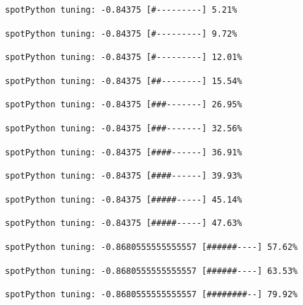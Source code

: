 \documentclass[
  letterpaper,
  DIV=11,
  numbers=noendperiod]{scrreprt}
\begin{document}
\begin{verbatim}
spotPython tuning: -0.84375 [#---------] 5.21% 
\end{verbatim}

\begin{verbatim}
spotPython tuning: -0.84375 [#---------] 9.72% 
\end{verbatim}

\begin{verbatim}
spotPython tuning: -0.84375 [#---------] 12.01% 
\end{verbatim}

\begin{verbatim}
spotPython tuning: -0.84375 [##--------] 15.54% 
\end{verbatim}

\begin{verbatim}
spotPython tuning: -0.84375 [###-------] 26.95% 
\end{verbatim}

\begin{verbatim}
spotPython tuning: -0.84375 [###-------] 32.56% 
\end{verbatim}

\begin{verbatim}
spotPython tuning: -0.84375 [####------] 36.91% 
\end{verbatim}

\begin{verbatim}
spotPython tuning: -0.84375 [####------] 39.93% 
\end{verbatim}

\begin{verbatim}
spotPython tuning: -0.84375 [#####-----] 45.14% 
\end{verbatim}

\begin{verbatim}
spotPython tuning: -0.84375 [#####-----] 47.63% 
\end{verbatim}

\begin{verbatim}
spotPython tuning: -0.8680555555555557 [######----] 57.62% 
\end{verbatim}

\begin{verbatim}
spotPython tuning: -0.8680555555555557 [######----] 63.53% 
\end{verbatim}

\begin{verbatim}
spotPython tuning: -0.8680555555555557 [########--] 79.92% 
\end{verbatim}
\end{document}
